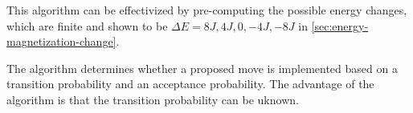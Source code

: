 \documentclass[../main.tex]{subfiles}
\begin{document}
This algorithm can be effectivized by pre-computing the possible energy changes, which are finite and shown to be \ensuremath{\Delta E= 8J, 4J, 0, -4J, -8J} in \cref{sec:energy-magnetization-change}. 

The algorithm determines whether a proposed move is implemented based on a transition probability and an acceptance probability. The advantage of the algorithm is that the transition probability can be uknown.
\end{document}
